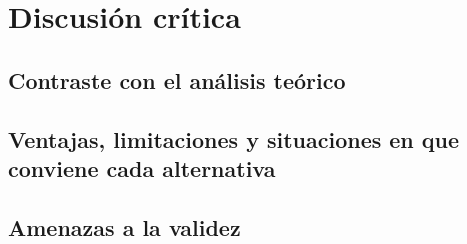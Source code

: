 \section{Discusión crítica}
\label{sec:discusion}

\subsection{Contraste con el análisis teórico}

\subsection{Ventajas, limitaciones y situaciones en que conviene cada alternativa}

\subsection{Amenazas a la validez}
